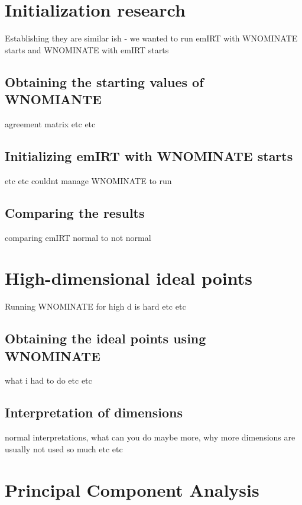 \documentclass{report}
\begin{document}
        \section{Initialization research}

            Establishing they are similar ish - we wanted to run emIRT with WNOMINATE starts and WNOMINATE with emIRT
            starts

            \subsection{Obtaining the starting values of WNOMIANTE}
                agreement matrix etc etc

            \subsection{Initializing emIRT with WNOMINATE starts}
                etc etc couldnt manage WNOMINATE to run

            \subsection{Comparing the results}
                comparing emIRT normal to not normal


        \section{High-dimensional ideal points}
            Running WNOMINATE for high d is hard etc etc

            \subsection{Obtaining the ideal points using WNOMINATE}
                what i had to do etc etc

            \subsection{Interpretation of dimensions}
                normal interpretations, what can you do maybe more, why more dimensions are usually not used so much etc
                etc


        \section{Principal Component Analysis}
\end{document}
